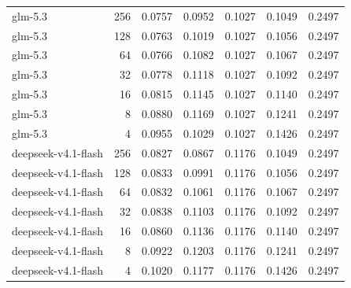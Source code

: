 \begin{longtable}{lrrrrrr}
glm-5.3 & 256 & 0.0757 & 0.0952 & 0.1027 & 0.1049 & 0.2497 \\
glm-5.3 & 128 & 0.0763 & 0.1019 & 0.1027 & 0.1056 & 0.2497 \\
glm-5.3 & 64 & 0.0766 & 0.1082 & 0.1027 & 0.1067 & 0.2497 \\
glm-5.3 & 32 & 0.0778 & 0.1118 & 0.1027 & 0.1092 & 0.2497 \\
glm-5.3 & 16 & 0.0815 & 0.1145 & 0.1027 & 0.1140 & 0.2497 \\
glm-5.3 & 8 & 0.0880 & 0.1169 & 0.1027 & 0.1241 & 0.2497 \\
glm-5.3 & 4 & 0.0955 & 0.1029 & 0.1027 & 0.1426 & 0.2497 \\
deepseek-v4.1-flash & 256 & 0.0827 & 0.0867 & 0.1176 & 0.1049 & 0.2497 \\
deepseek-v4.1-flash & 128 & 0.0833 & 0.0991 & 0.1176 & 0.1056 & 0.2497 \\
deepseek-v4.1-flash & 64 & 0.0832 & 0.1061 & 0.1176 & 0.1067 & 0.2497 \\
deepseek-v4.1-flash & 32 & 0.0838 & 0.1103 & 0.1176 & 0.1092 & 0.2497 \\
deepseek-v4.1-flash & 16 & 0.0860 & 0.1136 & 0.1176 & 0.1140 & 0.2497 \\
deepseek-v4.1-flash & 8 & 0.0922 & 0.1203 & 0.1176 & 0.1241 & 0.2497 \\
deepseek-v4.1-flash & 4 & 0.1020 & 0.1177 & 0.1176 & 0.1426 & 0.2497 \\
\bottomrule
\end{longtable}
